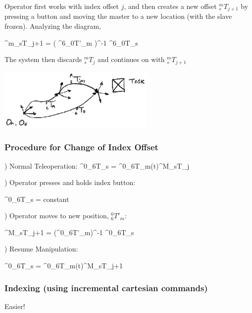  Operator first works with index offset $j$, and then creates a new offset $^m_sT_{j+1}$ by pressing a button and moving the master to a new location (with the slave frozen).  Analyzing the diagram, 	%

\bq
^m_sT_{j+1} = \left ( ^6_0T'_m \right )^{-1} {^6_0T_s}
\eq


The system then discards $^m_sT_j$ and continues on with $^m_sT_{j+1}$

\includegraphics[width=3.0in]{figs14/00407.eps}

\subsubsection{Procedure for Change of Index Offset}

) Normal Teleoperation:
\bq
^0_6T_s = ^0_6T_m(t)^M_sT_j
\eq

) Operator presses and holds index button:


\bq
{} \qquad ^0_6T_s = constant
\eq

) Operator moves to new position, $^0_6T'_m$:

\bq
^M_sT_{j+1} = \left (^0_6T'_m\right )^{-1} {^0_6T_s}
\eq

) Resume Manipulation:

\bq
^0_6T_s = ^0_6T_m(t)^M_sT_{j+1}
\eq





\subsubsection{Indexing (using incremental cartesian commands)}

Easier!


